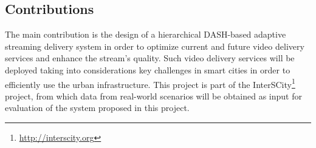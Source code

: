 \subsection*{Contributions}
\label{sec:contributions}

The main contribution is the design of a hierarchical DASH-based adaptive streaming delivery system in order to optimize current and future video delivery services and enhance the stream's quality. Such video delivery services will be deployed taking into considerations key challenges in smart cities in order to efficiently use the urban infrastructure. This project is part of the InterSCity\footnote{\url{http://interscity.org}} project, from which data from real-world scenarios will be obtained as input for evaluation of the system proposed in this project.